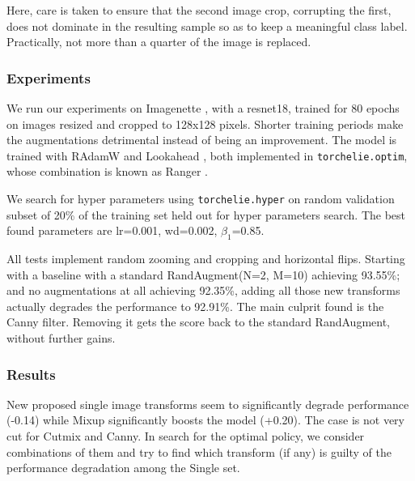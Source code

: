 Here, care is taken to ensure that the second image crop, corrupting the first, does not dominate in the resulting sample so as to keep a meaningful class label. Practically, not more than a quarter of the image is replaced.

\subsubsection{Experiments}

We run our experiments on Imagenette \citep{imagenette}, with a resnet18, trained for 80 epochs on images resized and cropped to 128x128 pixels. Shorter training periods make the augmentations detrimental instead of being an improvement. The model is trained with RAdamW \citep{radam} and Lookahead \citep{lookahead}, both implemented in \texttt{torchelie.optim}, whose combination is known as Ranger \citep{ranger}.

We search for hyper parameters using \texttt{torchelie.hyper} on random validation subset of 20\% of the training set held out for hyper parameters search. The best found parameters are lr=0.001, wd=0.002, $\beta_1$=0.85.

All tests implement random zooming and cropping and horizontal flips. Starting with a baseline with a standard RandAugment(N=2, M=10) achieving 93.55\%; and no augmentations at all achieving 92.35\%, adding all those new transforms actually degrades the performance to 92.91\%. The main culprit found is the Canny filter. Removing it gets the score back to the standard RandAugment, without further gains.

\subsubsection{Results}

New proposed single image transforms seem to significantly degrade performance (-0.14) while Mixup significantly boosts the model (+0.20). The case is not very cut for Cutmix and Canny. In search for the optimal policy, we consider combinations of them and try to find which transform (if any) is guilty of the performance degradation among the Single set.

